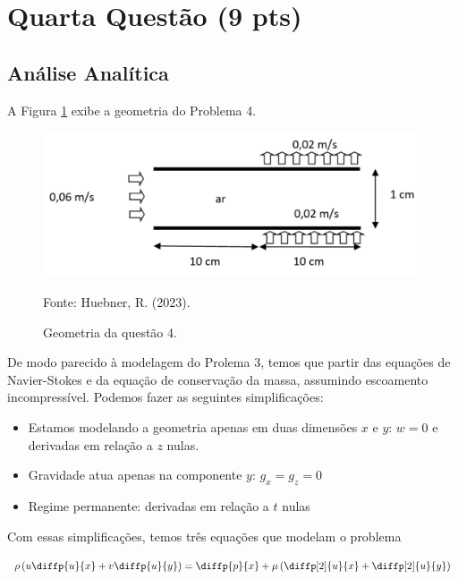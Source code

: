 
\section{Quarta Questão (9 pts)}

\subsection{Análise Analítica}


A Figura \ref*{fig:geometriaQ4} exibe a geometria do Problema 4.

\begin{figure}[h!]
    \caption{Geometria da questão 4.}
    \label{fig:geometriaQ4}
    \centering
    \centerline{\includegraphics[scale=0.35]{geometriaQ4.png}}
    \par{Fonte: Huebner, R. (2023).}
\end{figure}

De modo parecido à modelagem do Prolema 3, temos que partir das equações de Navier-Stokes e 
da equação de conservação da massa, assumindo escoamento incompressível. 
Podemos fazer as seguintes simplificações:

\begin{itemize}
    \item Estamos modelando a geometria apenas em duas dimensões $x$ e $y$: $w = 0$ e derivadas em relação a $z$ nulas.
    \item Gravidade atua apenas na componente $y$: $g_x = g_z = 0$
    \item Regime permanente: derivadas em relação a $t$ nulas
\end{itemize}

Com essas simplificações, temos três equações que modelam o problema

\begin{equation}\label{eq:Q4NS1}
        \rho\left(u\diffp{u}{x} + v\diffp{u}{y}\right)
         = \diffp{p}{x} + \mu \left(\diffp[2]{u}{x} + \diffp[2]{u}{y}\right)
\end{equation}


